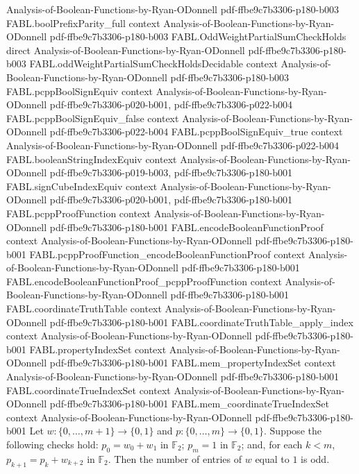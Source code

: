 \begin{theorem}
  {Analysis-of-Boolean-Functions-by-Ryan-ODonnell}
  {pdf-ffbe9c7b3306-p180-b003}
\proofstep
  {FABL.boolPrefixParity_full}
  {context}
  {Analysis-of-Boolean-Functions-by-Ryan-ODonnell}
  {pdf-ffbe9c7b3306-p180-b003}
\proofstep
  {FABL.OddWeightPartialSumCheckHolds}
  {direct}
  {Analysis-of-Boolean-Functions-by-Ryan-ODonnell}
  {pdf-ffbe9c7b3306-p180-b003}
\proofstep
  {FABL.oddWeightPartialSumCheckHoldsDecidable}
  {context}
  {Analysis-of-Boolean-Functions-by-Ryan-ODonnell}
  {pdf-ffbe9c7b3306-p180-b003}
\proofstep
  {FABL.pcppBoolSignEquiv}
  {context}
  {Analysis-of-Boolean-Functions-by-Ryan-ODonnell}
  {pdf-ffbe9c7b3306-p020-b001,
    pdf-ffbe9c7b3306-p022-b004}
\proofstep
  {FABL.pcppBoolSignEquiv_false}
  {context}
  {Analysis-of-Boolean-Functions-by-Ryan-ODonnell}
  {pdf-ffbe9c7b3306-p022-b004}
\proofstep
  {FABL.pcppBoolSignEquiv_true}
  {context}
  {Analysis-of-Boolean-Functions-by-Ryan-ODonnell}
  {pdf-ffbe9c7b3306-p022-b004}
\proofstep
  {FABL.booleanStringIndexEquiv}
  {context}
  {Analysis-of-Boolean-Functions-by-Ryan-ODonnell}
  {pdf-ffbe9c7b3306-p019-b003,
    pdf-ffbe9c7b3306-p180-b001}
\proofstep
  {FABL.signCubeIndexEquiv}
  {context}
  {Analysis-of-Boolean-Functions-by-Ryan-ODonnell}
  {pdf-ffbe9c7b3306-p020-b001,
    pdf-ffbe9c7b3306-p180-b001}
\proofstep
  {FABL.pcppProofFunction}
  {context}
  {Analysis-of-Boolean-Functions-by-Ryan-ODonnell}
  {pdf-ffbe9c7b3306-p180-b001}
\proofstep
  {FABL.encodeBooleanFunctionProof}
  {context}
  {Analysis-of-Boolean-Functions-by-Ryan-ODonnell}
  {pdf-ffbe9c7b3306-p180-b001}
\proofstep
  {FABL.pcppProofFunction_encodeBooleanFunctionProof}
  {context}
  {Analysis-of-Boolean-Functions-by-Ryan-ODonnell}
  {pdf-ffbe9c7b3306-p180-b001}
\proofstep
  {FABL.encodeBooleanFunctionProof_pcppProofFunction}
  {context}
  {Analysis-of-Boolean-Functions-by-Ryan-ODonnell}
  {pdf-ffbe9c7b3306-p180-b001}
\proofstep
  {FABL.coordinateTruthTable}
  {context}
  {Analysis-of-Boolean-Functions-by-Ryan-ODonnell}
  {pdf-ffbe9c7b3306-p180-b001}
\proofstep
  {FABL.coordinateTruthTable_apply_index}
  {context}
  {Analysis-of-Boolean-Functions-by-Ryan-ODonnell}
  {pdf-ffbe9c7b3306-p180-b001}
\proofstep
  {FABL.propertyIndexSet}
  {context}
  {Analysis-of-Boolean-Functions-by-Ryan-ODonnell}
  {pdf-ffbe9c7b3306-p180-b001}
\proofstep
  {FABL.mem_propertyIndexSet}
  {context}
  {Analysis-of-Boolean-Functions-by-Ryan-ODonnell}
  {pdf-ffbe9c7b3306-p180-b001}
\proofstep
  {FABL.coordinateTrueIndexSet}
  {context}
  {Analysis-of-Boolean-Functions-by-Ryan-ODonnell}
  {pdf-ffbe9c7b3306-p180-b001}
\proofstep
  {FABL.mem_coordinateTrueIndexSet}
  {context}
  {Analysis-of-Boolean-Functions-by-Ryan-ODonnell}
  {pdf-ffbe9c7b3306-p180-b001}
Let $w\colon\{0,\ldots,m+1\}\to\{0,1\}$ and $p\colon\{0,\ldots,m\}\to\{0,1\}$. Suppose
the following checks hold: $p_0=w_0+w_1$ in $\mathbb F_2$; $p_m=1$ in $\mathbb F_2$;
and, for each $k<m$, $p_{k+1}=p_k+w_{k+2}$ in $\mathbb F_2$. Then the number of entries
of $w$ equal to $1$ is odd.
\end{theorem}

